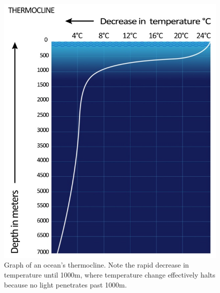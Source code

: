 \documentclass{article}
\begin{document}
\begin{figure}[H]
	\centering
	\includegraphics[scale=1]{./Images/BC1_Thermocline.jpg}
	\caption{Graph of an ocean's thermocline. Note the rapid decrease in temperature until 1000m, where temperature change effectively halts because no light penetrates past 1000m.}
\end{figure}
\end{document}
